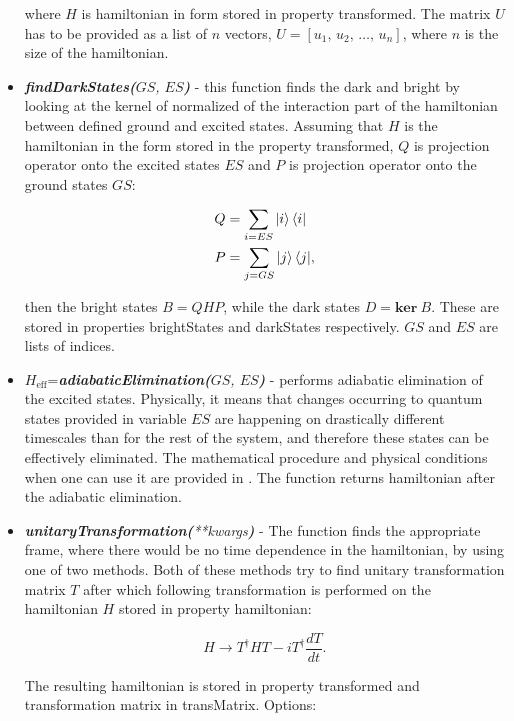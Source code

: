 \documentclass{article}
\numberwithin{equation}{section}
\numberwithin{figure}{section}
\numberwithin{table}{section}
\newcommand\codefun[2]{\textit{\textbf{#1(}#2\textbf{)}}}
\newcommand\codevar[1]{\ttfamily #1\rmfamily}
\begin{document}
\begin{itemize}
where $H$ is hamiltonian in form stored in property \codevar{transformed}. The matrix $U$ has to be provided as a list of $n$ vectors, $U=[u_1,\,u_2,\,\ldots,\,u_n]$, where $n$ is the size of the hamiltonian.

\item \codefun{findDarkStates}{$GS$, $ES$} - this function finds the dark and bright by looking at the kernel of normalized of the interaction part of the hamiltonian between defined ground and excited states. Assuming that $H$ is the hamiltonian in the form stored in the property \codevar{transformed}, $Q$ is projection operator onto the excited states $ES$ and $P$ is projection operator onto the ground states $GS$:

\begin{align*}
Q&=\sum_{i=ES}{\ket{i}\bra{i}}\\
P&=\sum_{j=GS}{\ket{j}\bra{j}},
\end{align*}

\noindent then the bright states $B=QHP$, while the dark states $D=\mathrm{\textbf{ker}}\ B$. These are stored in properties \codevar{brightStates} and \codevar{darkStates} respectively. $GS$ and $ES$ are lists of indices. 

\item $H_{\mathrm{eff}}$=\codefun{adiabaticElimination}{$GS$, $ES$} - performs adiabatic elimination of the excited states. Physically, it means that changes occurring to quantum states provided in variable $ES$ are happening on drastically different timescales than for the rest of the system, and therefore these states can be effectively eliminated. The mathematical procedure and physical conditions when one can use it are provided in \cite{adel}. The function returns hamiltonian after the adiabatic elimination. 

\item \codefun{unitaryTransformation}{**kwargs} - The function finds the appropriate frame, where there would be no time dependence in the hamiltonian, by using one of two methods. Both of these methods try to find unitary transformation matrix $T$ after which following transformation is performed on the hamiltonian $H$ stored in property \codevar{hamiltonian}:

\begin{displaymath}
H\rightarrow T^{\dagger}HT-iT^{\dagger}\frac{dT}{dt}.
\end{displaymath}

\noindent The resulting hamiltonian is stored in property \codevar{transformed} and transformation matrix in \codevar{transMatrix}.
\newline
\noindent Options:


\end{itemize}
\end{document}
